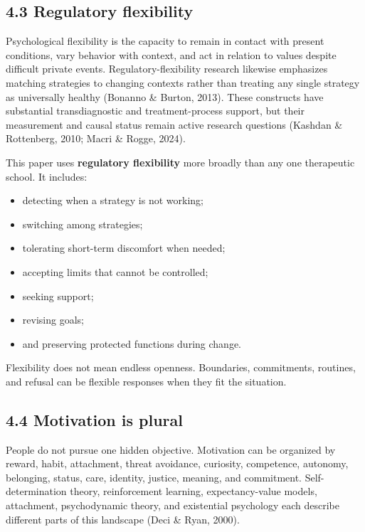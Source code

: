 \documentclass[
  11pt,
]{article}
\providecommand{\tightlist}{%
  \setlength{\itemsep}{0pt}\setlength{\parskip}{0pt}}
\begin{document}
\subsection{4.3 Regulatory flexibility}\label{regulatory-flexibility}

Psychological flexibility is the capacity to remain in contact with
present conditions, vary behavior with context, and act in relation to
values despite difficult private events. Regulatory-flexibility research
likewise emphasizes matching strategies to changing contexts rather than
treating any single strategy as universally healthy (Bonanno \& Burton,
2013). These constructs have substantial transdiagnostic and
treatment-process support, but their measurement and causal status
remain active research questions (Kashdan \& Rottenberg, 2010; Macri \&
Rogge, 2024).

This paper uses \textbf{regulatory flexibility} more broadly than any
one therapeutic school. It includes:

\begin{itemize}
\tightlist
\item
  detecting when a strategy is not working;
\item
  switching among strategies;
\item
  tolerating short-term discomfort when needed;
\item
  accepting limits that cannot be controlled;
\item
  seeking support;
\item
  revising goals;
\item
  and preserving protected functions during change.
\end{itemize}

Flexibility does not mean endless openness. Boundaries, commitments,
routines, and refusal can be flexible responses when they fit the
situation.

\subsection{4.4 Motivation is plural}\label{motivation-is-plural}

People do not pursue one hidden objective. Motivation can be organized
by reward, habit, attachment, threat avoidance, curiosity, competence,
autonomy, belonging, status, care, identity, justice, meaning, and
commitment. Self-determination theory, reinforcement learning,
expectancy-value models, attachment, psychodynamic theory, and
existential psychology each describe different parts of this landscape
(Deci \& Ryan, 2000).
\end{document}
